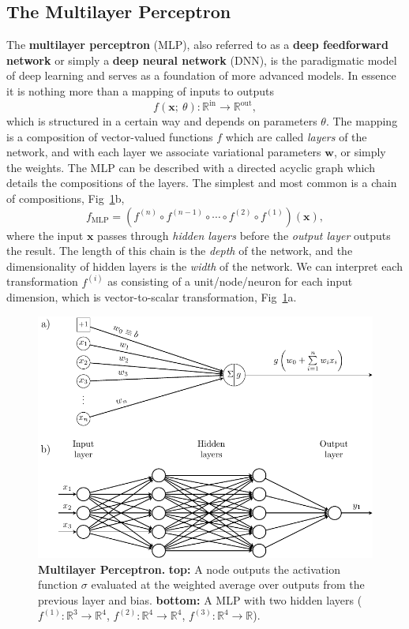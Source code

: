 \subsection{The Multilayer Perceptron}
The \textbf{multilayer perceptron} (MLP), also referred to as a \textbf{deep feedforward network} or simply a \textbf{deep neural network} (DNN), is the paradigmatic model of deep learning and serves as a foundation of more advanced models. In essence it is nothing more than a mapping of inputs to outputs
\begin{equation}
	f(\mathbf{x}; ~\theta): \mathbb{R}^\text{in} \rightarrow \mathbb{R}^{\text{out}},
\end{equation}
which is structured in a certain way and depends on parameters $\theta$. The mapping is a composition of vector-valued functions $f$ which are called \emph{layers} of the network, and with each layer we associate variational parameters $\mathbf{w}$, or simply the weights. The MLP can be described with a directed acyclic graph which details the compositions of the layers. The simplest and most common is a chain of compositions, Fig~\ref{fig:mlp}b, 
\begin{equation}
f_{\text{MLP}} = \left(f^{(n)} \circ f^{(n-1)} \circ \cdots \circ f^{(2)} \circ f^{(1)} \right)(\mathbf{x}),
\end{equation}
where the input $\textbf{x}$ passes through \emph{hidden layers} before the \emph{output layer} outputs the result. The length of this chain is the \emph{depth} of the network, and the dimensionality of hidden layers is the \emph{width} of the network. We can interpret each transformation $f^{(i)}$ as consisting of a unit/node/neuron for each input dimension, which is vector-to-scalar transformation, Fig~\ref{fig:mlp}a.
\begin{figure}[H]
	\centering
	\includegraphics[width=\linewidth]{Chapter4/Figs/Vector/mlp.pdf}
	\caption[Multilayer Perceptron]{\textbf{Multilayer Perceptron.} \textbf{top: }A node outputs the activation function $\sigma$ evaluated at the weighted average over outputs from the previous layer and bias. \textbf{bottom: } A MLP with two hidden layers ($f^{(1)}: \mathbb{R}^3 \rightarrow \mathbb{R}^4$, $f^{(2)}: \mathbb{R}^4 \rightarrow \mathbb{R}^4$, $f^{(3)}: \mathbb{R}^4 \rightarrow \mathbb{R}$).}
	\label{fig:mlp}
\end{figure} 
